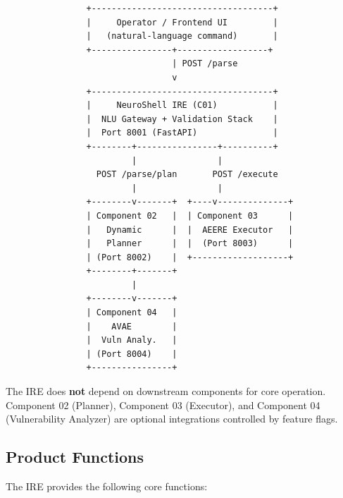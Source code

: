 ﻿\documentclass[10pt,journal,onecolumn]{IEEEtran}
\begin{document}
\begin{lstlisting}
                +------------------------------------+
                |     Operator / Frontend UI         |
                |   (natural-language command)       |
                +----------------+------------------+
                                 | POST /parse
                                 v
                +------------------------------------+
                |     NeuroShell IRE (C01)           |
                |  NLU Gateway + Validation Stack    |
                |  Port 8001 (FastAPI)               |
                +--------+----------------+----------+
                         |                |
                  POST /parse/plan       POST /execute
                         |                |
                +--------v-------+  +----v--------------+
                | Component 02   |  | Component 03      |
                |   Dynamic      |  |  AEERE Executor   |
                |   Planner      |  |  (Port 8003)      |
                | (Port 8002)    |  +-------------------+
                +--------+-------+
                         |
                +--------v-------+
                | Component 04   |
                |    AVAE        |
                |  Vuln Analy.   |
                | (Port 8004)    |
                +----------------+
\end{lstlisting}

The IRE does \textbf{not} depend on downstream components for core operation. Component 02 (Planner), Component 03 (Executor), and Component 04 (Vulnerability Analyzer) are optional integrations controlled by feature flags.

\subsection{Product Functions}
The IRE provides the following core functions:
\end{document}
